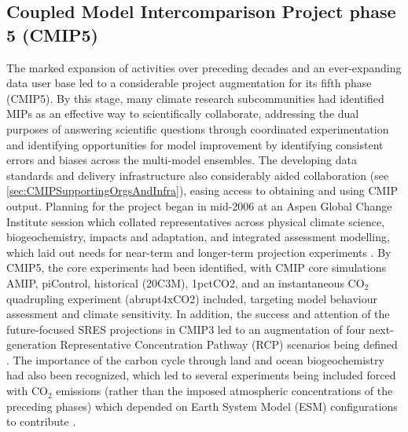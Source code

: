 \documentclass[gmd, preprint]{copernicus}
\begin{document}
\subsection{Coupled Model Intercomparison Project phase 5 (CMIP5)}
\label{sec:cmip5ProjectDesign}
The marked expansion of activities over preceding decades and an ever-expanding data user base led to a considerable project augmentation for its fifth phase (CMIP5). By this stage, many climate research subcommunities had identified MIPs as an effective way to scientifically collaborate, addressing the dual purposes of answering scientific questions through coordinated experimentation and identifying opportunities for model improvement by identifying consistent errors and biases across the multi-model ensembles. The developing data standards and delivery infrastructure also considerably aided collaboration (see \autoref{sec:CMIPSupportingOrgsAndInfra}), easing access to obtaining and using CMIP output. Planning for the project began in mid-2006 at an Aspen Global Change Institute session which collated representatives across physical climate science, biogeochemistry, impacts and adaptation, and integrated assessment modelling, which laid out needs for near-term and longer-term projection experiments \citep{meehl_introduction_2011}. By CMIP5, the core experiments had been identified, with CMIP core simulations AMIP, piControl, historical (20C3M), 1pctCO2, and an instantaneous CO$_{2}$ quadrupling experiment (abrupt4xCO2) included, targeting model behaviour assessment and climate sensitivity. In addition, the success and attention of the future-focused SRES projections in CMIP3 led to an augmentation of four next-generation Representative Concentration Pathway (RCP) scenarios being defined \citep{moss_next_2010}. The importance of the carbon cycle through land and ocean biogeochemistry had also been recognized, which led to several experiments being included forced with CO$_{2}$ emissions (rather than the imposed atmospheric concentrations of the preceding phases) which depended on Earth System Model (ESM) configurations to contribute \citep{hibbard_strategy_2007,meehl_introduction_2011}.
\end{document}
